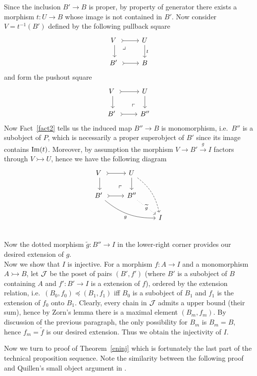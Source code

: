 \documentclass[twoside]{article}
\begin{document}
Since the inclusion $B' \rightarrow B$ is proper, by property of generator there exists a morphism $t\colon U \rightarrow B$ whose image is not contained in $B'$. Now consider $V = t^{-1}(B')$ defined by the following pullback square
$$\begin{tikzcd}
    V \ \ar[r, tail] \ar[d] \pullback& U \ar[d, "t"]\\
B' \ \ar[r, tail] & B
\end{tikzcd}$$
and form the pushout square 
$$\begin{tikzcd}
    V \ \ar[r, tail] \ar[d]  & U \ar[d]\\
B' \ \ar[r, tail] & B'' \pushout
\end{tikzcd}$$
Now Fact~\ref{fact2} tells us the induced map $B'' \rightarrow B$ is monomorphism, i.e.\ $B''$ is a subobject of $P$, which is necessarily a proper superobject of $B'$ since its image contains $\mathrm{Im}(t)$. Moreover, by assumption the morphism $V \rightarrow B' \xrightarrow{g} I$ factors through $V \rightarrowtail U$, hence we have the following diagram
$$
\begin{tikzcd}
    V \ \ar[d] \ar[r, tail] & U \ar[d] \ar[ddr, dashed, bend left=20] &\\
        B' \ \ar[r, tail] \ar[drr, bend right=20, "g"'] & B'' \pushout \ar[dr, dotted, "\widetilde{g}" description] & \\
        & & I\\
\end{tikzcd}
$$
Now the dotted morphism $\widetilde{g}\colon B'' \rightarrow I$ in the lower-right corner provides our desired extension of $g$.\\

Now we show that $I$ is injective. For a morphism $f\colon A \rightarrow I$ and a monomorphism $A \rightarrowtail B$, let ${\mathcal{J}}$ be the poset of pairs $(B', f')$ (where $B'$ is a subobject of $B$ containing $A$ and $f'\colon B' \rightarrow I$ is a extension of $f$), ordered by the extension relation, i.e.\ $(B_0, f_0) \preccurlyeq (B_1,f_1)$ iff $B_0$ is a subobject of $B_1$ and $f_1$ is the extension of $f_0$ onto $B_1$. Clearly, every chain in ${\mathcal{J}}$ admits a upper bound (their sum), hence by Zorn's lemma there is a maximal element $(B_m, f_m)$. By discussion of the previous paragraph, the only possibility for $B_m$ is $B_m = B$, hence $f_m = \widetilde{f}$ is our desired extension. Thus we obtain the injectivity of $I$.
\epf

Now we turn to proof of Theorem~\ref{eninj} which is fortunately the last part of the technical proposition sequence. Note the similarity between the following proof and Quillen's small object argument in \cite{Qui67}.
\end{document}
